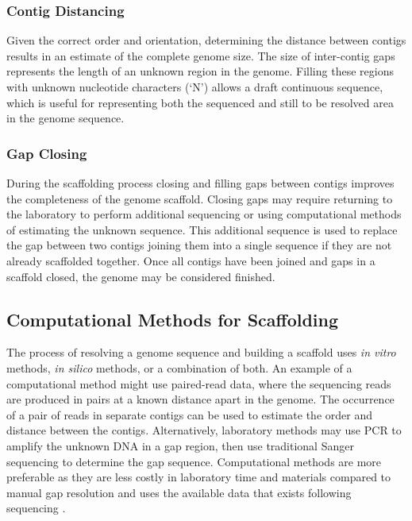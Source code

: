 \documentclass[10pt]{bmc_article}
\newenvironment{bmcformat}{\begin{raggedright}\baselineskip20pt\sloppy\setboolean{publ}{false}}{\end{raggedright}\baselineskip20pt\sloppy}
\begin{document}
\begin{bmcformat}
\subsubsection*{Contig Distancing} %

Given the correct order and orientation, determining the distance between
contigs results in an estimate of the complete genome size. The size of
inter-contig gaps represents the length of an unknown region in the genome.
Filling these regions with unknown nucleotide characters (`N') allows a draft
continuous sequence, which is useful for representing both the sequenced and
still to be resolved area in the genome sequence.

\subsubsection*{Gap Closing} %

During the scaffolding process closing and filling gaps between contigs
improves the completeness of the genome scaffold. Closing gaps may require
returning to the laboratory to perform additional sequencing or using
computational methods of estimating the unknown sequence. This additional
sequence is used to replace the gap between two contigs joining them into
a single sequence if they are not already scaffolded together. Once all contigs
have been joined and gaps in a scaffold closed, the genome may be considered
finished.

\subsection*{Computational Methods for Scaffolding} %

The process of resolving a genome sequence and building a scaffold uses
\emph{in vitro} methods, \emph{in silico} methods, or a combination of both. An
example of a computational method might use paired-read data, where the
sequencing reads are produced in pairs at a known distance apart in the genome.
The occurrence of a pair of reads in separate contigs can be used to estimate
the order and distance between the contigs. Alternatively, laboratory methods
may use PCR to amplify the unknown DNA in a gap region, then use traditional
Sanger sequencing to determine the gap sequence. Computational methods are more
preferable as they are less costly in laboratory time and materials compared to
manual gap resolution and uses the available data that exists following
sequencing \cite{nagarajan2010}. \pb


\end{bmcformat}
\end{document}
